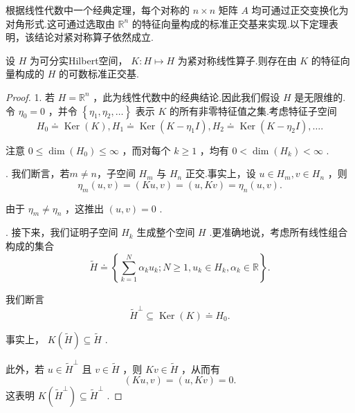 根据线性代数中一个经典定理，每个对称的 $n \times  n$ 矩阵 $A$ 均可通过正交变换化为对角形式.这可通过选取由 ${\mathbb{R}}^{n}$ 的特征向量构成的标准正交基来实现.以下定理表明，该结论对紧对称算子依然成立.

\begin{theorem}\label{thm:hilbert-schmidt}
设 $H$ 为可分实Hilbert空间， $K : H \mapsto  H$ 为紧对称线性算子.则存在由 $K$ 的特征向量构成的 $H$ 的可数标准正交基.
\end{theorem}

\begin{proof}
1. 若 $H = {\mathbb{R}}^{n}$ ，此为线性代数中的经典结论.因此我们假设 $H$ 是无限维的.令 ${\eta }_{0} = 0$ ，并令 $\left\{  {{\eta }_{1},{\eta }_{2},\ldots }\right\}$ 表示 $K$ 的所有非零特征值之集.考虑特征子空间
\[
{H}_{0} \doteq  \operatorname{Ker}\left( K\right) ,{H}_{1} \doteq  \operatorname{Ker}\left( {K - {\eta }_{1}I}\right) ,{H}_{2} \doteq  \operatorname{Ker}\left( {K - {\eta }_{2}I}\right) ,\ldots .
\]

注意 $0 \leq  \dim \left( {H}_{0}\right)  \leq  \infty$ ，而对每个 $k \geq  1$ ，均有 $0 < \dim \left( {H}_{k}\right)  < \infty$ .

. 我们断言，若$m \neq  n$，子空间 ${H}_{m}$ 与 ${H}_{n}$ 正交.事实上，设 $u \in  {H}_{m},v \in  {H}_{n}$ ，则
\[
{\eta }_{m}\left( {u,v}\right)  = \left( {{Ku},v}\right)  = \left( {u,{Kv}}\right)  = {\eta }_{n}\left( {u,v}\right) .
\]

由于 ${\eta }_{m} \neq  {\eta }_{n}$ ，这推出 $\left( {u,v}\right)  = 0$ .

. 接下来，我们证明子空间 ${H}_{k}$ 生成整个空间 $H$ .更准确地说，考虑所有线性组合构成的集合
\[
\widetilde{H} \doteq  \left\{  {\mathop{\sum }\limits_{{k = 1}}^{N}{\alpha }_{k}{u}_{k};N \geq  1,{u}_{k} \in  {H}_{k},{\alpha }_{k} \in  \mathbb{R}}\right\}  .
\]

我们断言
\begin{equation}\tag{6.8}\label{eq:hilbert-schmidt-orthogonal-complement}
{\widetilde{H}}^{ \bot  } \subseteq  \operatorname{Ker}\left( K\right)  \doteq  {H}_{0}.
\end{equation}

事实上， $K\left( \widetilde{H}\right)  \subseteq  \widetilde{H}$ .\par
此外，若 $u \in  {\widetilde{H}}^{ \bot  }$ 且 $v \in  \widetilde{H}$ ，则 ${Kv} \in  \widetilde{H}$ ，从而有
\[
\left( {{Ku},v}\right)  = \left( {u,{Kv}}\right)  = 0.
\]
这表明 $K\left( {\widetilde{H}}^{ \bot  }\right)  \subseteq  {\widetilde{H}}^{ \bot  }$ .


\end{proof}
